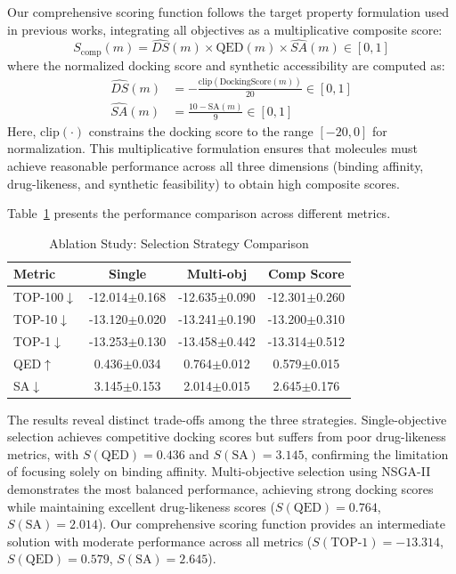 \documentclass[lettersize,journal]{IEEEtran}
\begin{document}
Our comprehensive scoring function follows the target property formulation used in previous works, integrating all objectives as a multiplicative composite score:
\begin{equation}
S_{\text{comp}}(m) =  \widehat{DS}(m) \times \text{QED}(m) \times \widehat{SA}(m) \in [0,1]
\end{equation}
where the normalized docking score and synthetic accessibility are computed as:
\begin{align}
\widehat{DS}(m) &= -\frac{\text{clip}(\text{DockingScore}(m))}{20} \in [0,1] \\
\widehat{SA}(m) &= \frac{10 - \text{SA}(m)}{9} \in [0,1]
\end{align}
Here, $\text{clip}(\cdot)$ constrains the docking score to the range $[-20, 0]$ for normalization. This multiplicative formulation ensures that molecules must achieve reasonable performance across all three dimensions (binding affinity, drug-likeness, and synthetic feasibility) to obtain high composite scores.

Table~\ref{tab:selection_ablation} presents the performance comparison across different metrics.

\begin{table}[!t]
    \caption{Ablation Study: Selection Strategy Comparison}
    \label{tab:selection_ablation}
    \centering    
    \small
    \setlength{\tabcolsep}{4pt}
    
    \begin{tabular}{l c c c}
        \hline\hline
        Metric & Single & Multi-obj & Comp Score \\
        \hline
        TOP-100$\downarrow$ & -12.014$\pm$0.168 & -12.635$\pm$0.090 & -12.301$\pm$0.260 \\
        TOP-10$\downarrow$ & -13.120$\pm$0.020 & -13.241$\pm$0.190 & -13.200$\pm$0.310 \\
        TOP-1$\downarrow$ & -13.253$\pm$0.130 & -13.458$\pm$0.442 & -13.314$\pm$0.512 \\
        QED$\uparrow$ & 0.436$\pm$0.034 & 0.764$\pm$0.012 & 0.579$\pm$0.015 \\
        SA$\downarrow$ & 3.145$\pm$0.153 & 2.014$\pm$0.015 & 2.645$\pm$0.176 \\
        \hline\hline
    \end{tabular}
\end{table}

The results reveal distinct trade-offs among the three strategies. Single-objective selection achieves competitive docking scores but suffers from poor drug-likeness metrics, with $S(\text{QED}) = 0.436$ and $S(\text{SA}) = 3.145$, confirming the limitation of focusing solely on binding affinity. Multi-objective selection using NSGA-II demonstrates the most balanced performance, achieving strong docking scores while maintaining excellent drug-likeness scores ($S(\text{QED}) = 0.764$, $S(\text{SA}) = 2.014$). Our comprehensive scoring function provides an intermediate solution with moderate performance across all metrics ($S(\text{TOP-1}) = -13.314$, $S(\text{QED}) = 0.579$, $S(\text{SA}) = 2.645$).
\end{document}
